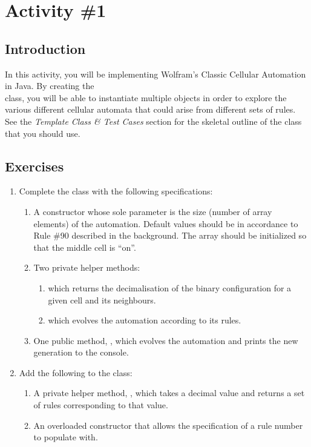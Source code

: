 
  \pagebreak

	\section{Activity \#1}
		\subsection{Introduction}
	  In this activity, you will be implementing Wolfram's Classic Cellular Automation in Java. By creating the\\  class, you will be able to instantiate multiple  objects in order to explore the various different cellular automata that could arise from different sets of rules. See the \emph{Template Class \& Test Cases} section for the skeletal outline of the  class that you should use.

	  \subsection{Exercises}
	    \begin{enumerate}
	      \item Complete the  class with the following specifications:
	        \begin{enumerate}
	          \item A constructor whose sole parameter is the size (number of array elements) of the automation. Default  values should be in accordance to Rule \#90 described in the background. The  array should be initialized so that the middle cell is ``on''.
	          \item Two private helper methods:
	          \begin{enumerate}
	            \item {} which returns the decimalisation of the binary configuration for a given cell and its neighbours.
	            \item {} which evolves the automation according to its rules.
	          \end{enumerate}
	          \item One public method, , which evolves the automation and prints the new generation to the console.
	        \end{enumerate}

	      \item Add the following to the  class:
	        \begin{enumerate}
	          \item A private helper method, , which takes a decimal  value and returns a set of rules corresponding to that value.
	          \item An overloaded constructor that allows the specification of a rule number to populate  with.
	        \end{enumerate}
	    \end{enumerate}

